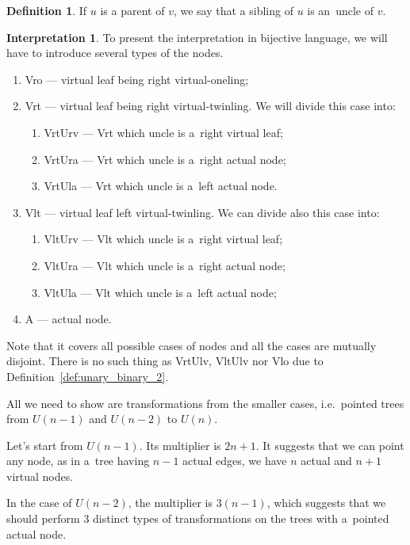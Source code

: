 \documentclass[final]{article}
\theoremstyle{definition}
\newtheorem{definition}{Definition}[subsection]
\theoremstyle{definition}
\newtheorem{interpretation}{Interpretation}[subsection]
\theoremstyle{remark}
\begin{document}
\begin{definition}
    If \(u\) is a parent of \(v\), we say that a sibling of \(u\) is an~uncle of \(v\).
\end{definition}

\begin{interpretation}
To present the interpretation in bijective language, we will have to introduce several types of the nodes.

\begin{enumerate}
    \item Vro --- virtual leaf being right virtual-oneling;
    \item Vrt --- virtual leaf being right virtual-twinling. We will divide this case into:
        \begin{enumerate}
            \item VrtUrv --- Vrt which uncle is a~right virtual leaf;
            \item VrtUra --- Vrt which uncle is a~right actual node;
            \item VrtUla --- Vrt which uncle is a~left actual node.
        \end{enumerate}
    \item Vlt --- virtual leaf left virtual-twinling. We can divide also this case into:
        \begin{enumerate}
            \item VltUrv --- Vlt which uncle is a~right virtual leaf;
            \item VltUra --- Vlt which uncle is a~right actual node;
            \item VltUla --- Vlt which uncle is a~left actual node;
        \end{enumerate}
    \item A --- actual node.
\end{enumerate}

Note that it covers all possible cases of nodes and all the cases are mutually disjoint. There is no such thing as VrtUlv, VltUlv nor Vlo due to Definition~\ref{def:unary_binary_2}.

All we need to show are transformations from the smaller cases, i.e.~pointed trees from \(U(n-1)\) and \(U(n-2)\) to \(U(n)\).

Let's start from \(U(n-1)\). Its multiplier is \(2n + 1\). It suggests that we can point any node, as in a~tree having \(n - 1\) actual edges, we have \(n\) actual and \(n + 1\) virtual nodes.

In the case of \(U(n-2)\), the multiplier is \(3(n-1)\), which suggests that we should perform \(3\) distinct types of transformations on the trees with a~pointed actual node.


\end{interpretation}
\end{document}
